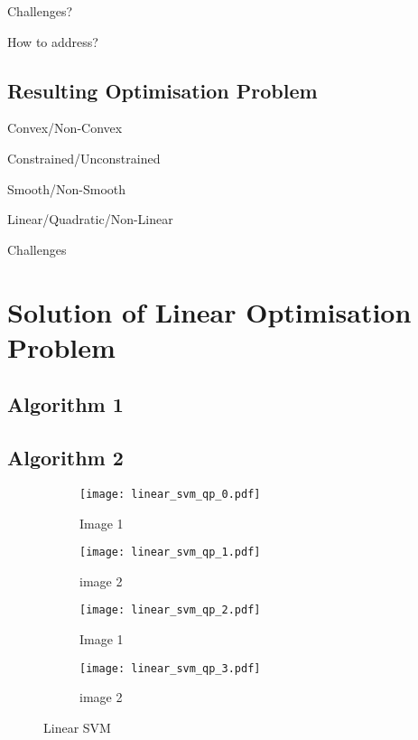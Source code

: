 \documentclass[10pt, a4paper,reqno]{amsart}
\begin{document}

Challenges?

How to address?

\subsection{Resulting Optimisation Problem}

Convex/Non-Convex

Constrained/Unconstrained

Smooth/Non-Smooth

Linear/Quadratic/Non-Linear

Challenges


\section{Solution of Linear Optimisation Problem}

\subsection{Algorithm 1}\hfill

\subsection{Algorithm 2}\hfill

\begin{figure}
	\centering	
	\begin{subfigure}{0.5\textwidth}
		\centering
		\texttt{[image: linear\_svm\_qp\_0.pdf]}
		\caption{Image 1}
	\end{subfigure}%
	\begin{subfigure}{0.5\textwidth}
		\centering
		\texttt{[image: linear\_svm\_qp\_1.pdf]}
		\caption{image 2}
	\end{subfigure}
	\begin{subfigure}{0.5\textwidth}
		\centering
		\texttt{[image: linear\_svm\_qp\_2.pdf]}
		\caption{Image 1}
	\end{subfigure}%
	\begin{subfigure}{0.5\textwidth}
		\centering
		\texttt{[image: linear\_svm\_qp\_3.pdf]}
		\caption{image 2}
	\end{subfigure}
	\caption{Linear SVM}
\end{figure}
\end{document}
